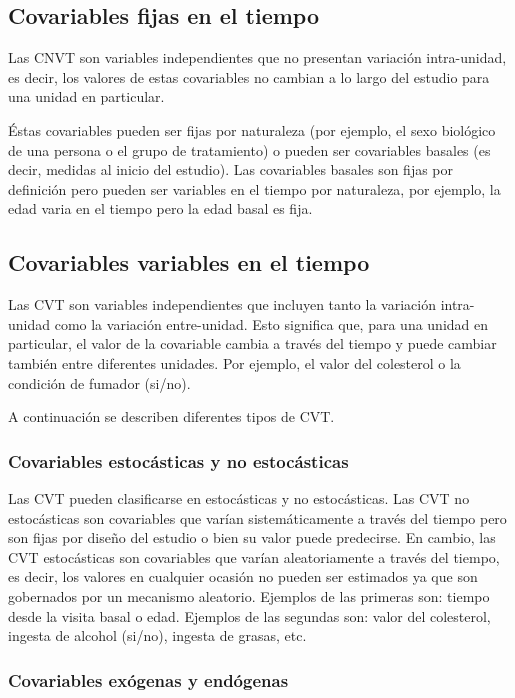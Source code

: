 \documentclass[spanish]{article}
\numberwithin{figure}{subsection}
\numberwithin{equation}{subsection}
\numberwithin{table}{subsection}
\begin{document}
\subsection{Covariables fijas en el tiempo}

Las CNVT son variables independientes que no presentan variación intra-unidad,
es decir, los valores de estas covariables no cambian a lo largo del estudio
para una unidad en particular.

Éstas covariables pueden ser fijas por naturaleza (por ejemplo, el sexo
biológico de una persona o el grupo de tratamiento) o pueden ser covariables
basales (es decir, medidas al inicio del estudio). Las covariables basales son
fijas por definición pero pueden ser variables en el tiempo por naturaleza, por
ejemplo, la edad varia en el tiempo pero la edad basal es fija.

\subsection{Covariables variables en el tiempo}

Las CVT son variables independientes que incluyen tanto la variación
intra-unidad como la variación entre-unidad. Esto significa que, para una unidad
en particular, el valor de la covariable cambia a través del tiempo y puede
cambiar también entre diferentes unidades. Por ejemplo, el valor del colesterol
o la condición de fumador (si/no).

A continuación se describen diferentes tipos de CVT.

\subsubsection{Covariables estocásticas y no estocásticas}

Las CVT pueden clasificarse en estocásticas y no estocásticas. Las CVT no
estocásticas son covariables que varían sistemáticamente a través del tiempo
pero son fijas por diseño del estudio o bien su valor puede predecirse. En
cambio, las CVT estocásticas son covariables que varían aleatoriamente a través
del tiempo, es decir, los valores en cualquier ocasión no pueden ser estimados
ya que son gobernados por un mecanismo aleatorio. Ejemplos de las primeras son:
tiempo desde la visita basal o edad. Ejemplos de las segundas son: valor del
colesterol, ingesta de alcohol (si/no), ingesta de grasas, etc.

\subsubsection{Covariables exógenas y endógenas}
\label{seccion_de_exogeneidad}
\end{document}
